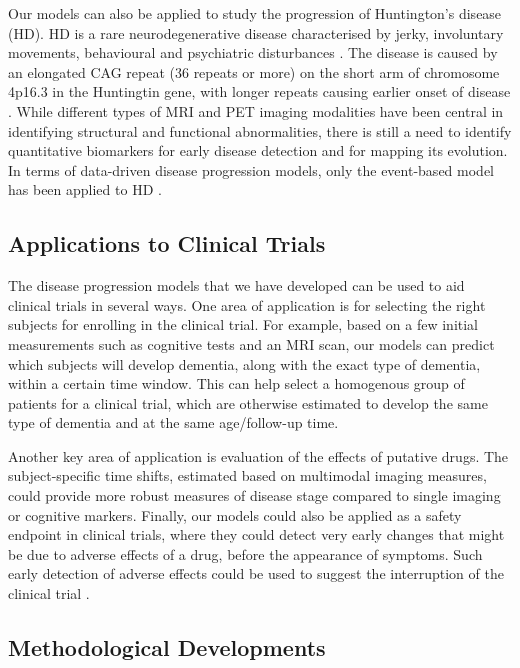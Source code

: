 Our models can also be applied to study the progression of Huntington's disease (HD). HD is a rare neurodegenerative disease characterised by jerky, involuntary movements, behavioural and psychiatric disturbances \cite{roos2010huntington}. The disease is caused by an elongated CAG repeat (36 repeats or more) on the short arm of chromosome 4p16.3 in the Huntingtin gene, with longer repeats causing earlier onset of disease \cite{roos2010huntington}. While different types of MRI \cite{georgiou2008magnetic} and PET \cite{feigin2001metabolic} imaging modalities have been central in identifying structural and functional abnormalities, there is still a need to identify quantitative biomarkers for early disease detection and for mapping its evolution\cite{georgiou2008magnetic}. In terms of data-driven disease progression models, only the event-based model has been applied to HD \cite{fonteijn2012event, wijeratne2018image}.


\subsection{Applications to Clinical Trials}
\label{sec:conCli}

The disease progression models that we have developed can be used to aid clinical trials in several ways. One area of application is for selecting the right subjects for enrolling in the clinical trial. For example, based on a few initial measurements such as cognitive tests and an MRI scan, our models can predict which subjects will develop dementia, along with the exact type of dementia, within a certain time window. This can help select a homogenous group of patients for a clinical trial, which are otherwise estimated to develop the same type of dementia and at the same age/follow-up time. 

Another key area of application is evaluation of the effects of putative drugs. The subject-specific time shifts, estimated based on multimodal imaging measures, could provide more robust measures of disease stage compared to single imaging or cognitive markers. Finally, our models could also be applied as a safety endpoint in clinical trials, where they could detect very early changes that might be due to adverse effects of a drug, before the appearance of symptoms. Such early detection of adverse effects could be used to suggest the interruption of the clinical trial \cite{cash2014imaging}. 

\subsection{Methodological Developments}
\label{sec:conMet}

